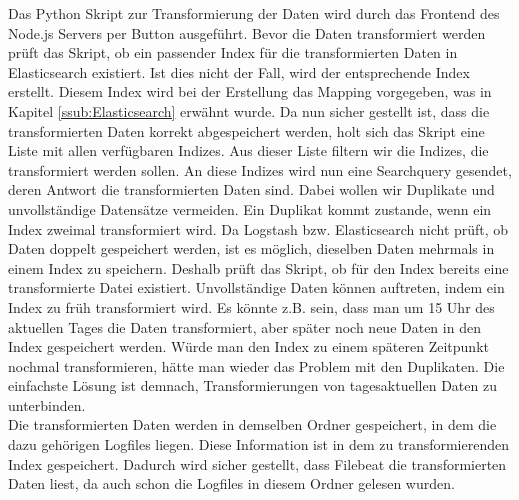 
Das Python Skript zur Transformierung der Daten wird durch das Frontend des Node.js Servers per Button ausgeführt. Bevor die Daten transformiert werden prüft das Skript, ob ein passender Index für die transformierten Daten in Elasticsearch existiert. Ist dies nicht der Fall, wird der entsprechende Index erstellt. Diesem Index wird bei der Erstellung das Mapping vorgegeben, was in Kapitel \ref{ssub:Elasticsearch} erwähnt wurde. Da nun sicher gestellt ist, dass die transformierten Daten korrekt abgespeichert werden, holt sich das Skript eine Liste mit allen verfügbaren Indizes. Aus dieser Liste filtern wir die Indizes, die transformiert werden sollen. An diese Indizes wird nun eine Searchquery gesendet, deren Antwort die transformierten Daten sind. Dabei wollen wir Duplikate und unvollständige Datensätze vermeiden. Ein Duplikat kommt zustande, wenn ein Index zweimal transformiert wird. Da Logstash bzw. Elasticsearch nicht prüft, ob Daten doppelt gespeichert werden, ist es möglich, dieselben Daten mehrmals in einem Index zu speichern. Deshalb prüft das Skript, ob für den Index bereits eine transformierte Datei existiert. Unvollständige Daten können auftreten, indem ein Index zu früh transformiert wird. Es könnte z.B. sein, dass man um 15 Uhr des aktuellen Tages die Daten transformiert, aber später noch neue Daten in den Index gespeichert werden. Würde man den Index zu einem späteren Zeitpunkt nochmal transformieren, hätte man wieder das Problem mit den Duplikaten. Die einfachste Lösung ist demnach, Transformierungen von tagesaktuellen Daten zu unterbinden.\\
Die transformierten Daten werden in demselben Ordner gespeichert, in dem die dazu gehörigen Logfiles liegen. Diese Information ist in dem zu transformierenden Index gespeichert. Dadurch wird sicher gestellt, dass Filebeat die transformierten Daten liest, da auch schon die Logfiles in diesem Ordner gelesen wurden.


